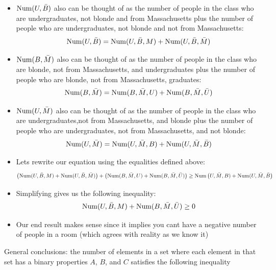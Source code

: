 \documentclass[a4paper]{article}
\begin{document}
\begin{itemize}
    \item $\mathrm{Num}(U,\Bar{B})$ also can be thought of as the number of people in the class who are undergraduates, not blonde and from Massachusetts plus the number of people who are undergraduates, not blonde and not from Massachusetts:
        \begin{equation}
            \mathrm{Num}(U,\Bar{B}) = \mathrm{Num}(U,\Bar{B},M) + \mathrm{Num}(U,\Bar{B},\Bar{M})
        \end{equation}
    \item $\mathrm{Num}(B,\Bar{M})$ also can be thought of as the number of people in the class who are blonde, not from Massachusetts, and undergraduates plus the number of people who are blonde, not from Massachusetts, graduates:
        \begin{equation}
            \mathrm{Num}(B,\Bar{M}) = \mathrm{Num}(B,\Bar{M},U) + \mathrm{Num}(B,\Bar{M},\Bar{U})
        \end{equation}
    \item $\mathrm{Num}(U,\Bar{M})$ also can be thought of as the number of people in the class who are undergraduates,not from Massachusetts, and blonde plus the number of people who are undergraduates, not from Massachusetts, and not blonde:
        \begin{equation}
            \mathrm{Num}(U,\Bar{M}) = \mathrm{Num}(U,\Bar{M},B) + \mathrm{Num}(U,\Bar{M},\Bar{B})
        \end{equation}
    \item Lets rewrite our equation using the equalities defined above: 
    \begin{equation}
        \left(\mathrm{Num}(U,\Bar{B},M) + \mathrm{Num}(U,\Bar{B},\Bar{M})\right) + \left(\mathrm{Num}(B,\Bar{M},U) + \mathrm{Num}(B,\Bar{M},\Bar{U})\right) \geq \mathrm{Num}\left(U,\Bar{M},B) + \mathrm{Num}(U,\Bar{M},\Bar{B}\right)
    \end{equation}
    \item Simplifying gives us the following inequality:
    \begin{equation}
        \mathrm{Num}(U,\Bar{B},M) + \mathrm{Num}(B,\Bar{M},\Bar{U}) \geq 0
    \end{equation}
    \item Our end result makes sense since it implies you cant have a negative number of people in a room (which agrees with reality as we know it)
\end{itemize}
General conclusions: the number of elements in a set where each element in that set has a binary properties $A$, $B$, and $C$ satisfies the following inequality
\end{document}

